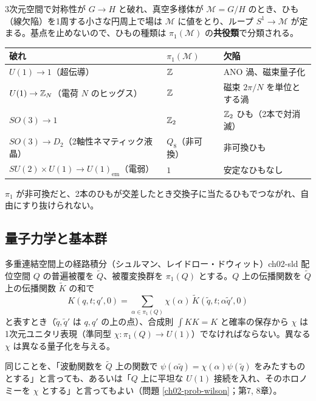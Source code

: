 \begin{physbox}[：ひも状欠陥の分類]
3次元空間で対称性が $G\to H$ と破れ、真空多様体が $\mathcal M=G/H$ のとき、ひも（線欠陥）を1周する小さな円周上で場は $\mathcal M$ に値をとり、ループ $S^1\to\mathcal M$ が定まる。基点を止めないので、ひもの種類は $\pi_1(\mathcal M)$ の\textbf{共役類}で分類される。
\begin{center}
\renewcommand{\arraystretch}{1.2}\small
\begin{tabular}{lll}
破れ & $\pi_1(\mathcal M)$ & 欠陥\\ \hline
$U(1)\to1$（超伝導） & $\mathbb{Z}$ & ANO 渦、磁束量子化\\
$U(1)\to\mathbb{Z}_N$（電荷 $N$ のヒッグス） & $\mathbb{Z}$ & 磁束 $2\pi/N$ を単位とする渦\\
$SO(3)\to1$ & $\mathbb{Z}_2$ & $\mathbb{Z}_2$ ひも（2本で対消滅）\\
$SO(3)\to D_2$（2軸性ネマティック液晶） & $Q_8$（非可換） & 非可換ひも\\
$SU(2)\times U(1)\to U(1)_{\mathrm{em}}$（電弱） & $1$ & 安定なひもなし
\end{tabular}
\end{center}
$\pi_1$ が非可換だと、2本のひもが交差したとき交換子に当たるひもでつながれ、自由にすり抜けられない。
\end{physbox}

\subsection{量子力学と基本群}

\begin{mythm}{多重連結空間上の経路積分（シュルマン、レイドロー・ドウィット）}{ch02-sld}
配位空間 $Q$ の普遍被覆を $\tilde Q$、被覆変換群を $\pi_1(Q)$ とする。$Q$ 上の伝播関数を $\tilde Q$ 上の伝播関数 $\tilde K$ の和で
\[
K(q,t;q',0)=\sum_{\alpha\in\pi_1(Q)}\chi(\alpha)\,\tilde K(\tilde q,t;\alpha\tilde q',0)
\]
と表すとき（$\tilde q,\tilde q'$ は $q,q'$ の上の点）、合成則 $\int K K=K$ と確率の保存から $\chi$ は1次元ユニタリ表現（準同型 $\chi\colon\pi_1(Q)\to U(1)$）でなければならない。異なる $\chi$ は異なる量子化を与える。
\end{mythm}
同じことを、「波動関数を $\tilde Q$ 上の関数で $\psi(\alpha\tilde q)=\chi(\alpha)\psi(\tilde q)$ をみたすものとする」と言っても、あるいは「$Q$ 上に平坦な $U(1)$ 接続を入れ、そのホロノミーを $\chi$ とする」と言ってもよい（問題 \ref{ch02-prob-wilson}；第7, 8章）。

